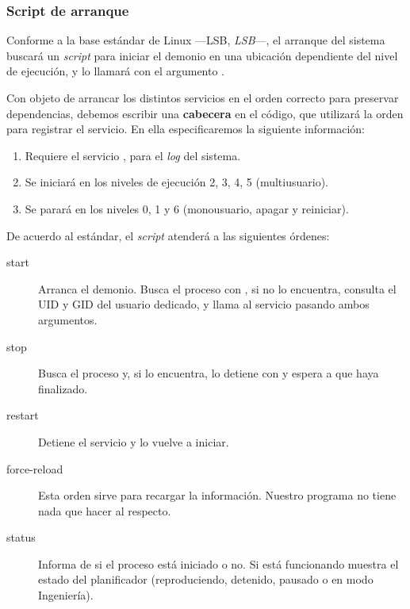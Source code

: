 \subsubsection{Script de arranque}

Conforme a la base estándar de Linux ---\acrshort{LSB}, \textit{\acrlong{LSB}}---, el arranque del sistema buscará un \textit{script} para iniciar el demonio en una ubicación dependiente del nivel de ejecución, y lo llamará con el argumento . \cite{debian_lsbinit}

Con objeto de arrancar los distintos servicios en el orden correcto para preservar dependencias, debemos escribir una \textbf{cabecera} en el código, que utilizará la orden  para registrar el servicio. En ella especificaremos la siguiente información:

\begin{enumerate}
	\item Requiere el servicio , para el \textit{log} del sistema.
	\item Se iniciará en los niveles de ejecución 2, 3, 4, 5 (multiusuario). \cite{wiki_runlevel}
	\item Se parará en los niveles 0, 1 y 6 (monousuario, apagar y reiniciar).
\end{enumerate}

De acuerdo al estándar, el \textit{script} atenderá a las siguientes órdenes:

\begin{description}
	\item[start] Arranca el demonio. Busca el proceso con , si no lo encuentra, consulta el \acrshort{UID} y \acrshort{GID} del usuario dedicado, y llama al servicio pasando ambos argumentos.
	
	\item[stop] Busca el proceso y, si lo encuentra, lo detiene con  y espera a que haya finalizado.
	
	\item[restart] Detiene el servicio y lo vuelve a iniciar.
	
	\item[force-reload] Esta orden sirve para recargar la información. Nuestro programa no tiene nada que hacer al respecto.
	
	\item[status] Informa de si el proceso está iniciado o no. Si está funcionando muestra el estado del planificador (reproduciendo, detenido, pausado o en modo Ingeniería).
\end{description}

